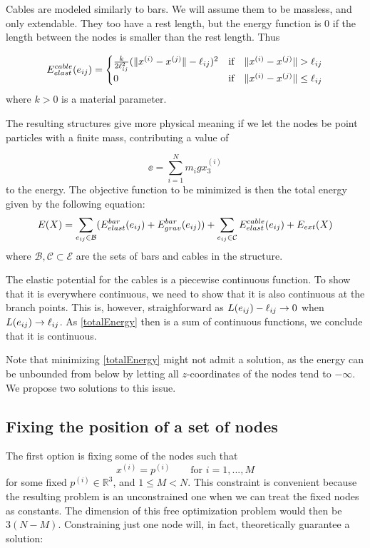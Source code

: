 Cables are modeled similarly to bars. We will assume them to be massless, and only extendable. They too have a rest length, but the energy function is $0$ if the length between the nodes is smaller than the rest length. Thus

\begin{equation}
E^{cable}_{elast}(e_{ij}) = \begin{cases}
    \frac{k}{2\ell_{ij}^2}(\lVert x^{(i)} - x^{(j)}\rVert-\ell_{ij})^2 & \text{if} \quad \lVert x^{(i)} - x^{(j)}\rVert >\ell_{ij}\\
    0 & \text{if} \quad \lVert x^{(i)} - x^{(j)}\rVert \leq \ell_{ij}
    \end{cases}
    \label{cableElast}
\end{equation}
where $k > 0$ is a material parameter.

The resulting structures give more physical meaning if we let the nodes be point particles with a finite mass, contributing a value of

\begin{equation}
    \ee = \sum_{i=1}^{N} m_i g x_3^{(i)}
    \label{externalEnergy}
\end{equation}
to the energy. The objective function to be minimized is then the total energy given by the following equation:
\begin{equation}
    E(X) = \sum\limits_{e_{ij} \in \mathcal{B}}(E^{bar}_{elast}(e_{ij}) + E^{bar}_{grav}(e_{ij})) + \sum\limits_{e_{ij} \in \mathcal{C}} E^{cable}_{elast}(e_{ij}) + E_{ext}(X)
    \label{totalEnergy}
\end{equation} where $\mathcal{B}, \mathcal{C} \subset \mathcal{E}$ are the sets of bars and cables in the structure.

The elastic potential for the cables is a piecewise continuous function. To show that it is everywhere continuous, we need to show that it is also continuous at the branch points. This is, however, straighforward as $L(e_{ij}) - \ell_{ij} \rightarrow 0$ when $L(e_{ij}) \rightarrow \ell_{ij}$. As \eqref{totalEnergy} then is a sum of continuous functions, we conclude that it is continuous.

Note that minimizing \eqref{totalEnergy} might not admit a solution, as the energy can be unbounded from below by letting all $z$-coordinates of the nodes tend to $-\infty$. We propose two solutions to this issue.

\subsection{Fixing the position of a set of nodes}\label{subsec:fix}
The first option is fixing some of the nodes such that
\begin{equation}
    x^{(i)} = p^{(i)} \qquad \text{for } i = 1,...,M
    \label{fixednode}
\end{equation} for some fixed $p^{(i)} \in \mathbb{R}^3$, and $1\leq M < N$. This constraint is convenient because the resulting problem is an unconstrained one when we can treat the fixed nodes as constants. The dimension of this free optimization problem would then be $3(N-M)$. Constraining just one node will, in fact, theoretically guarantee a solution:

